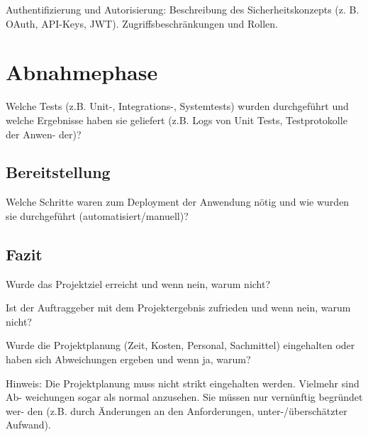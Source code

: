 \documentclass[a4paper,12pt]{article}
\begin{document}
Authentifizierung und Autorisierung: Beschreibung des Sicherheitskonzepts (z. B.
OAuth, API-Keys, JWT).  Zugriffsbeschränkungen und Rollen.

\newpage \section{Abnahmephase}
Welche Tests (z.B. Unit-, Integrations-,
Systemtests) wurden durchgeführt und welche Ergebnisse haben sie geliefert
(z.B. Logs von Unit Tests, Testprotokolle der Anwen- der)?

\subsection{Bereitstellung}
Welche Schritte waren zum Deployment der Anwendung
nötig und wie wurden sie durchgeführt (automatisiert/manuell)?

\subsection{Fazit}
Wurde das Projektziel erreicht und wenn nein, warum nicht?

Ist der Auftraggeber mit dem Projektergebnis zufrieden und wenn nein, warum
nicht?

Wurde die Projektplanung (Zeit, Kosten, Personal, Sachmittel) eingehalten oder
haben sich Abweichungen ergeben und wenn ja, warum?

Hinweis: Die Projektplanung muss nicht strikt eingehalten werden. Vielmehr sind
Ab- weichungen sogar als normal anzusehen. Sie müssen nur vernünftig begründet
wer- den (z.B. durch Änderungen an den Anforderungen, unter-/überschätzter
Aufwand).

\newpage
\printbibliography
\end{document}
